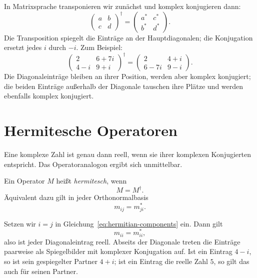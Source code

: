 In Matrixsprache transponieren wir zunächst und komplex konjugieren dann:
\begin{equation}
\begin{pmatrix}
a&b\\
c&d
\end{pmatrix}^{\!\dagger}
=
\begin{pmatrix}
a^*&c^*\\
b^*&d^*
\end{pmatrix}.
\label{eq:dagger-two-by-two}
\end{equation}
Die Transposition spiegelt die Einträge an der Hauptdiagonalen; die Konjugation ersetzt jedes \(i\) durch \(-i\). Zum Beispiel:
\begin{equation}
\begin{pmatrix}
2&6+7i\\
4-i&9+i
\end{pmatrix}^{\!\dagger}
=
\begin{pmatrix}
2&4+i\\
6-7i&9-i
\end{pmatrix}.
\label{eq:dagger-numerical-example}
\end{equation}
Die Diagonaleinträge bleiben an ihrer Position, werden aber komplex konjugiert; die beiden Einträge außerhalb der Diagonale tauschen ihre Plätze und werden ebenfalls komplex konjugiert.

\section{Hermitesche Operatoren}

Eine komplexe Zahl ist genau dann reell, wenn sie ihrer komplexen Konjugierten entspricht. Das Operatoranalogon ergibt sich unmittelbar.

\begin{definition}Ein Operator \(M\) heißt \emph{hermitesch}, wenn
\begin{equation}
M=M^\dagger.
\label{eq:hermitian-definition}
\end{equation}
Äquivalent dazu gilt in jeder Orthonormalbasis
\begin{equation}
m_{ij}=m_{ji}^*.
\label{eq:hermitian-components}
\end{equation}
\end{definition}

Setzen wir \(i=j\) in Gleichung~\eqref{eq:hermitian-components} ein. Dann gilt
\[
m_{ii}=m_{ii}^*,
\]
also ist jeder Diagonaleintrag reell. Abseits der Diagonale treten die Einträge paarweise als Spiegelbilder mit komplexer Konjugation auf. Ist ein Eintrag \(4-i\), so ist sein gespiegelter Partner \(4+i\); ist ein Eintrag die reelle Zahl \(5\), so gilt das auch für seinen Partner.

